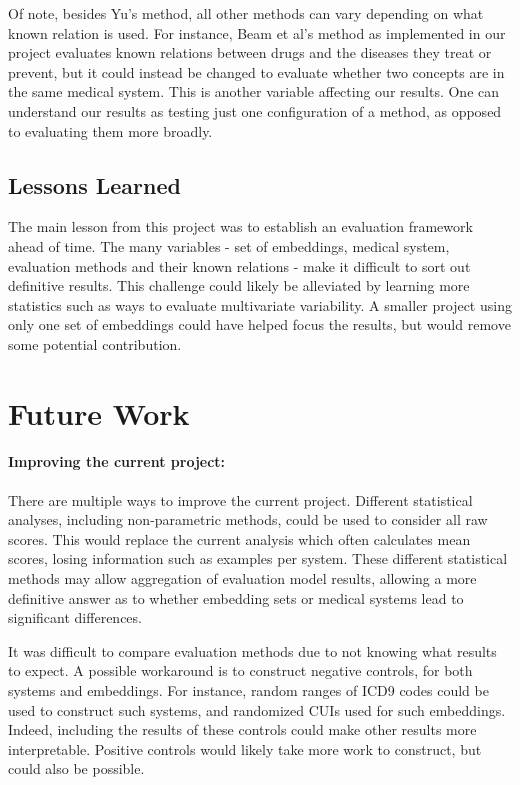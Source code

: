 \documentclass[10pt]{article}
\begin{document}
Of note, besides Yu's method, all other methods can vary depending on what known relation is used. For instance, Beam et al's method as implemented in our project evaluates known relations between drugs and the diseases they treat or prevent, but it could instead be changed to evaluate whether two concepts are in the same medical system. This is another variable affecting our results. One can understand our results as testing just one configuration of a method, as opposed to evaluating them more broadly.

\subsection{Lessons Learned}
The main lesson from this project was to establish an evaluation framework ahead of time. The many variables - set of embeddings, medical system, evaluation methods and their known relations - make it difficult to sort out definitive results. This challenge could likely be alleviated by learning more statistics such as ways to evaluate multivariate variability. A smaller project using only one set of embeddings could have helped focus the results, but would remove some potential contribution. 

\section{Future Work}
\paragraph{Improving the current project:} There are multiple ways to improve the current project. Different statistical analyses, including non-parametric methods, could be used to consider all raw scores. This would replace the current analysis which often calculates mean scores, losing information such as examples per system. These different statistical methods may allow aggregation of evaluation model results, allowing a more definitive answer as to whether embedding sets or medical systems lead to significant differences.  

It was difficult to compare evaluation methods due to not knowing what results to expect. A possible workaround is to construct negative controls, for both systems and embeddings. For instance, random ranges of ICD9 codes could be used to construct such systems, and randomized CUIs used for such embeddings. Indeed, including the results of these controls could make other results more interpretable. Positive controls would likely take more work to construct, but could also be possible. 
\end{document}
